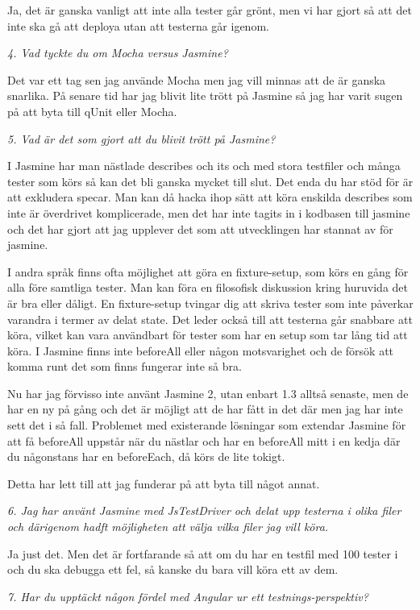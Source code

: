 \documentclass[11pt]{article}
\begin{document}
Ja, det är ganska vanligt att inte alla tester går grönt, men vi har gjort så att det inte ska gå att deploya utan att testerna går igenom.

\emph{4. Vad tyckte du om Mocha versus Jasmine?}

Det var ett tag sen jag använde Mocha men jag vill minnas att de är ganska snarlika. På senare tid har jag blivit lite trött på Jasmine så jag har varit sugen på att byta till qUnit eller Mocha.

\emph{5. Vad är det som gjort att du blivit trött på Jasmine?}

I Jasmine har man nästlade describes och its och med stora testfiler och många tester som körs så kan det bli ganska mycket till slut. Det enda du har stöd för är att exkludera specar. Man kan då hacka ihop sätt att köra enskilda describes som inte är överdrivet komplicerade, men det har inte tagits in i kodbasen till jasmine och det har gjort att jag upplever det som att utvecklingen har stannat av för jasmine.

I andra språk finns ofta möjlighet att göra en fixture-setup, som körs en gång för alla före samtliga tester. Man kan föra en filosofisk diskussion kring huruvida det är bra eller dåligt. En fixture-setup tvingar dig att skriva tester som inte påverkar varandra i termer av delat state. Det leder också till att testerna går snabbare att köra, vilket kan vara användbart för tester som har en setup som tar lång tid att köra. I Jasmine finns inte beforeAll eller någon motsvarighet och de försök att komma runt det som finns fungerar inte så bra.

Nu har jag förvisso inte använt Jasmine 2, utan enbart 1.3 alltså senaste, men de har en ny på gång och det är möjligt att de har fått in det där men jag har inte sett det i så fall. Problemet med existerande lösningar som extendar Jasmine för att få beforeAll uppstår när du nästlar och har en beforeAll mitt i en kedja där du någonstans har en beforeEach, då körs de lite tokigt.

Detta har lett till att jag funderar på att byta till något annat.

\emph{6. Jag har använt Jasmine med JsTestDriver och delat upp testerna i olika filer och därigenom hadft möjligheten att välja vilka filer jag vill köra.}

Ja just det. Men det är fortfarande så att om du har en testfil med 100 tester i och du ska debugga ett fel, så kanske du bara vill köra ett av dem.

\emph{7. Har du upptäckt någon fördel med Angular ur ett testnings-perspektiv?}
\end{document}
